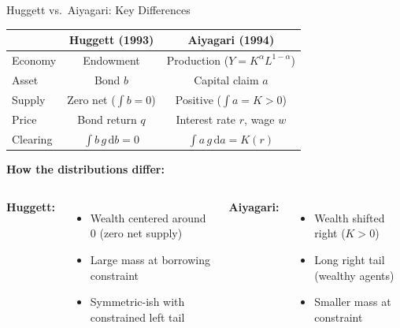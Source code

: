 \documentclass[aspectratio=169,11pt]{beamer}
\newcommand{\ud}{\,\mathrm{d}}
\begin{document}
\begin{frame}{Huggett vs.\ Aiyagari: Key Differences}
\small
\begin{center}
\renewcommand{\arraystretch}{1.1}
\begin{tabular}{lcc}
\toprule
& \textbf{Huggett (1993)} & \textbf{Aiyagari (1994)} \\
\midrule
Economy & Endowment & Production ($Y = K^\alpha L^{1-\alpha}$) \\
Asset & Bond $b$ & Capital claim $a$ \\
Supply & Zero net ($\int b = 0$) & Positive ($\int a = K > 0$) \\
Price & Bond return $q$ & Interest rate $r$, wage $w$ \\
Clearing & $\int b\,g\ud b = 0$ & $\int a\,g\ud a = K(r)$ \\
\bottomrule
\end{tabular}
\end{center}

\vspace{0.1em}
\textbf{How the distributions differ:}
\begin{columns}[T]
\textbf{Huggett:}
\begin{itemize}\itemsep0pt
    \item Wealth centered around $0$ (zero net supply)
    \item Large mass at borrowing constraint
    \item Symmetric-ish with constrained left tail
\end{itemize}

\textbf{Aiyagari:}
\begin{itemize}\itemsep0pt
    \item Wealth shifted right ($K > 0$)
    \item Long right tail (wealthy agents)
    \item Smaller mass at constraint
\end{itemize}
\end{columns}
\end{frame}
\end{document}
